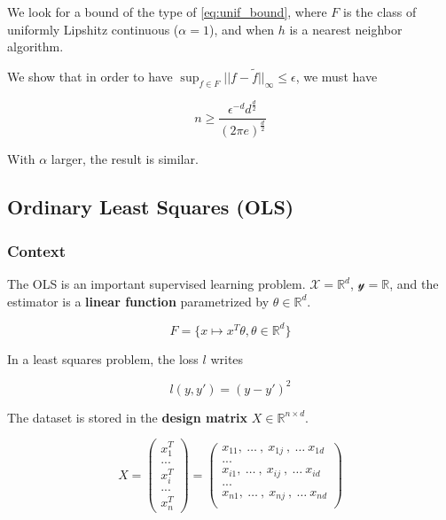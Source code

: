 \documentclass[
10pt, %
a4paper, %
oneside, %
headinclude,footinclude, %
BCOR5mm, %
]{scrartcl}
\begin{document}
    We look for a bound of the type of \ref{eq:unif_bound}, where $F$ is the class of uniformly Lipshitz continuous ($\alpha=1$), and when  $h$ is a nearest neighbor algorithm.

    We show that in order to have $ \sup_{f\in F}||f- \tilde{f}||_{\infty}\leq \epsilon$, we must have

    \begin{equation*}
	n\geq \frac{\epsilon^{-d}d^{ \frac{d}{2} }}{(2\pi e)^{ \frac{d}{2} } }
    \end{equation*}

    \begin{remark}
        With $\alpha$ larger, the result is similar.
    \end{remark}


\subsection{\large\color{MidnightBlue}Ordinary Least Squares (OLS)}
\label{subsec:ols}

\subsubsection{\large\color{Periwinkle}Context}
\label{con:ols}

The OLS is an important supervised learning problem. $ \mathcal{X} = \mathbb{R}^d$, $ \mathcal{y}  = \mathbb{R} $, and the estimator is a \textbf{{linear function}} parametrized by $ \theta\in \mathbb{R}^d$.

\begin{equation*}
    F = \{ x\mapsto x^T \theta, \theta \in \mathbb{R}^d\}
\end{equation*}

In a least squares problem, the loss $l$ writes 

\begin{equation*}
    l(y,y') = (y-y')^2
\end{equation*}

The dataset is stored in the \textbf{{design matrix}} $X\in \mathbb{R}^{n\times d}$.

\begin{equation*}
X=
\begin{pmatrix}
x_{1}^T\\
...\\
x_{i}^T\\
...\\
x_{n}^T
\end{pmatrix}
=
\begin{pmatrix}
    x_{11}, \:\dots\:,\: x_{1j}\:, \:\dots\: x_{1d}\\
...\\
    x_{i1}, \:\dots\:,\: x_{ij}\:, \:\dots\: x_{id}\\
...\\
    x_{n1}, \:\dots\:,\: x_{nj}\:, \:\dots\: x_{nd}\\
\end{pmatrix}
\end{equation*}
\end{document}
